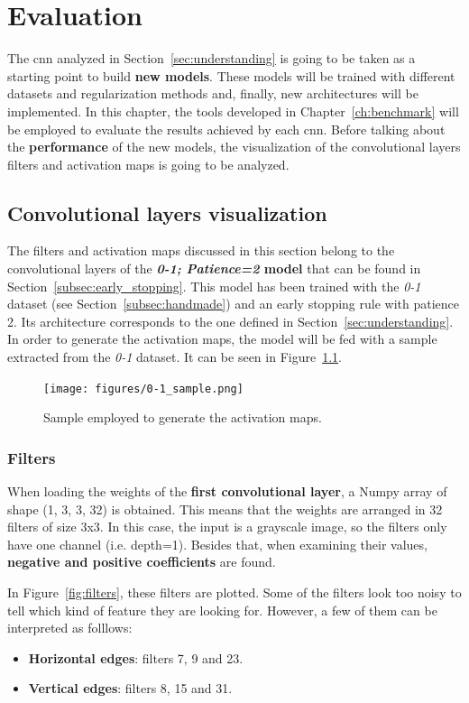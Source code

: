 \chapter{Evaluation}\label{sec:new_models}
The \gls{cnn} analyzed in Section~\ref{sec:understanding} is going to be taken as a starting point to build \textbf{new models}. These models will be trained with different datasets and regularization methods and, finally, new architectures will be implemented. In this chapter, the tools developed in Chapter~\ref{ch:benchmark} will be employed to evaluate the results achieved by each \gls{cnn}. Before talking about the \textbf{performance} of the new models, the visualization of the convolutional layers filters and activation maps is going to be analyzed.

\section{Convolutional layers visualization}
The filters and activation maps discussed in this section belong to the convolutional layers of the \textbf{\textit{0-1; Patience=2} model} that can be found in Section~\ref{subsec:early_stopping}. This model has been trained with the \textit{0-1} dataset (see Section~\ref{subsec:handmade}) and an early stopping rule with patience 2. Its architecture corresponds to the one defined in Section~\ref{sec:understanding}. In order to generate the activation maps, the model will be fed with a sample extracted from the \textit{0-1} dataset. It can be seen in Figure~\ref{fig:sample}.
\begin{figure}
	\centering
	\texttt{[image: figures/0-1\_sample.png]}
	\caption{Sample employed to generate the activation maps.}
	\label{fig:sample}
\end{figure}

\subsection{Filters}
When loading the weights of the \textbf{first convolutional layer}, a Numpy array of shape (1, 3, 3, 32) is obtained. This means that the weights are arranged in 32 filters of size 3x3. In this case, the input is a grayscale image, so the filters only have one channel (i.e. depth=1). Besides that, when examining their values, \textbf{negative and positive coefficients} are found.

In Figure~\ref{fig:filters}, these filters are plotted. Some of the filters look too noisy to tell which kind of feature they are looking for. However, a few of them can be interpreted as folllows:
\begin{itemize}
	\item \textbf{Horizontal edges}: filters 7, 9 and 23.
	\item \textbf{Vertical edges}: filters 8, 15 and 31.	
\end{itemize}


